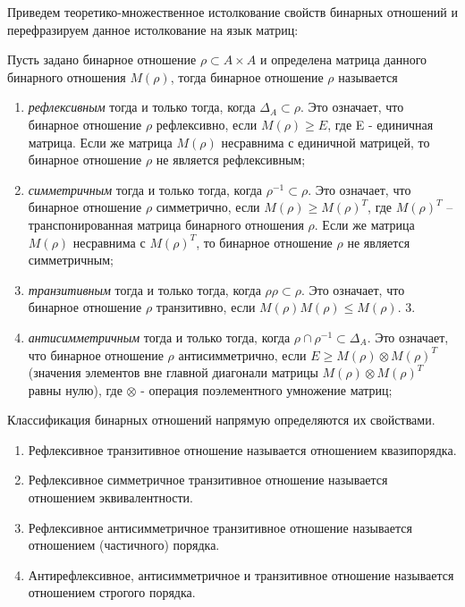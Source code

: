 \documentclass[spec, och, labwork]{shiza}
\begin{document}
        Приведем теоретико-множественное истолкование свойств бинарных отношений и перефразируем данное истолкование на язык матриц:
        
        Пусть задано бинарное отношение $\rho \subset A \times A$ и определена матрица данного бинарного отношения $M(\rho)$, тогда бинарное отношение $\rho$ называется

        \begin{enumerate}
            \item \textit{рефлексивным} тогда и только тогда, когда $\Delta_A \subset \rho$. Это означает, что бинарное
            отношение $\rho$ рефлексивно, если $M(\rho) \geq E$, где E - единичная матрица. Если же матрица $M(\rho)$ 
            несравнима с единичной матрицей, то бинарное отношение $\rho$ не является рефлексивным;
            \item \textit{симметричным} тогда и только тогда, когда $\rho^{-1} \subset \rho$. Это означает, что бинарное 
            отношение $\rho$ симметрично, если $M(\rho) \geq M(\rho)^T$, где $M(\rho)^T$ – транспонированная матрица 
            бинарного отношения $\rho$. Если же матрица $M(\rho)$ несравнима с $M(\rho)^T$, то бинарное отношение $\rho$
            не является симметричным;
            \item \textit{транзитивным} тогда и только тогда, когда $\rho \rho \subset \rho$. Это означает, что бинарное
            отношение $\rho$ транзитивно, если $M(\rho)M(\rho) \leq M(\rho)$.
            3. \item \textit{антисимметричным} тогда и только тогда, когда $\rho \cap \rho^{-1} \subset \Delta_A$. Это означает, что бинарное отношение $\rho$ 
            антисимметрично, если $E \geq M(\rho) \otimes M(\rho)^T$ (значения элементов вне главной диагонали матрицы $M(\rho) \otimes M(\rho)^T$ равны нулю), где
            $\otimes$ - операция поэлементного умножение матриц;
        \end{enumerate}

        Классификация бинарных отношений напрямую определяются их свойствами.

        \begin{enumerate}
            \item Рефлексивное транзитивное отношение называется отношением квазипорядка.
            \item Рефлексивное симметричное транзитивное отношение называется отношением эквивалентности.
            \item Рефлексивное антисимметричное транзитивное отношение называется отношением (частичного) порядка.
            \item Антирефлексивное, антисимметричное и транзитивное отношение называется отношением строгого порядка.
        \end{enumerate}
\end{document}

